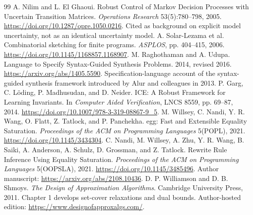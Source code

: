 \documentclass[11pt,oneside,openany]{book}
\numberwithin{equation}{section}
\begin{document}
\begin{thebibliography}{99}
 A. Nilim and L. El Ghaoui. Robust Control of Markov Decision Processes with Uncertain Transition Matrices. \emph{Operations Research} 53(5):780--798, 2005. \url{https://doi.org/10.1287/opre.1050.0216}. Cited as background on explicit model uncertainty, not as an identical uncertainty model.
 A. Solar-Lezama et al. Combinatorial sketching for finite programs. \emph{ASPLOS}, pp. 404--415, 2006. \url{https://doi.org/10.1145/1168857.1168907}.
 M. Raghothaman and A. Udupa. Language to Specify Syntax-Guided Synthesis Problems. 2014, revised 2016. \url{https://arxiv.org/abs/1405.5590}. Specification-language account of the syntax-guided synthesis framework introduced by Alur and colleagues in 2013.
 P. Garg, C. L\"oding, P. Madhusudan, and D. Neider. ICE: A Robust Framework for Learning Invariants. In \emph{Computer Aided Verification}, LNCS 8559, pp. 69--87, 2014. \url{https://doi.org/10.1007/978-3-319-08867-9_5}.
 M. Willsey, C. Nandi, Y. R. Wang, O. Flatt, Z. Tatlock, and P. Panchekha. egg: Fast and Extensible Equality Saturation. \emph{Proceedings of the ACM on Programming Languages} 5(POPL), 2021. \url{https://doi.org/10.1145/3434304}.
 C. Nandi, M. Willsey, A. Zhu, Y. R. Wang, B. Saiki, A. Anderson, A. Schulz, D. Grossman, and Z. Tatlock. Rewrite Rule Inference Using Equality Saturation. \emph{Proceedings of the ACM on Programming Languages} 5(OOPSLA), 2021. \url{https://doi.org/10.1145/3485496}. Author manuscript: \url{https://arxiv.org/abs/2108.10436}.
 D. P. Williamson and D. B. Shmoys. \emph{The Design of Approximation Algorithms}. Cambridge University Press, 2011. Chapter 1 develops set-cover relaxations and dual bounds. Author-hosted edition: \url{https://www.designofapproxalgs.com/}.
\end{thebibliography}
\end{document}
